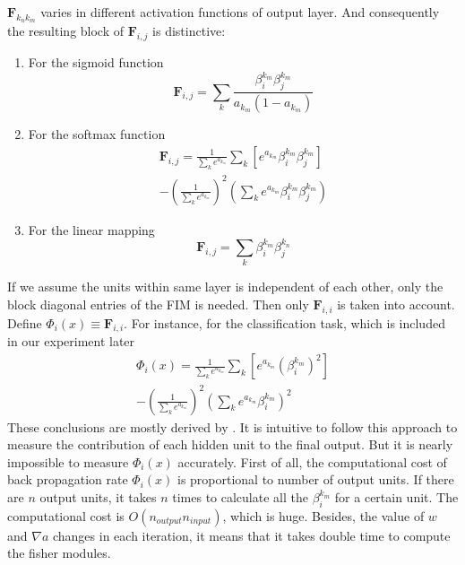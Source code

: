 \documentclass{sig-alternate}
\begin{document}
    $\pmb{F}_{k_nk_m}$ varies in different activation functions of output layer. And consequently the resulting block of $\pmb{F}_{i,j}$ is distinctive:
    \begin{enumerate}
        \item For the sigmoid function
        \begin{equation}
            \pmb{F}_{i,j} = \sum_{k}\frac{\beta_i^{k_m}\beta_j^{k_m}}{a_{k_m}(1-a_{k_m})}
        \end{equation}
        \item For the softmax function
        \begin{equation}
            \begin{aligned}
            \pmb{F}_{i,j} = \frac{1}{\sum_k e^{a_{k_m}}}\sum_k [e^{a_{k_m}}\beta_i^{k_m}\beta_j^{k_m}]
            \\
            -(\frac{1}{\sum_k e^{a_{k_m}}})^{2}(\sum_k e^{a_{k_m}}\beta_i^{k_m}\beta_j^{k_m})
            \end{aligned}
        \end{equation}
        \item For the linear mapping
        \begin{equation}
            \pmb{F}_{i,j} = \sum_k \beta_i^{k_m}\beta_j^{k_n}
        \end{equation}
    \end{enumerate}
    If we assume the units within same layer is independent of each other, only the block diagonal entries of the FIM is needed. Then only $\pmb{F}_{i,i}$ is taken into account. Define $\Phi_i(x) \equiv \pmb{F}_{i, i}$. For instance, for the classification task, which is included in our experiment later
    \begin{equation}
        \begin{aligned}
         \Phi_i(x)= \frac{1}{\sum_k e^{a_{k_m}}}\sum_k [e^{a_{k_m}}(\beta_i^{k_m})^{2}]\\
         -(\frac{1}{\sum_k e^{a_{k_m}}})^{2}(\sum_k e^{a_{k_m}}\beta_i^{k_m})^{2}
        \end{aligned}
    \end{equation}
    These conclusions are mostly derived by \cite{DBLP:journals/corr/abs-1303-0818}. It is intuitive to follow this approach to measure the contribution of each hidden unit to the final output. But it is nearly impossible to measure $\Phi_i(x)$ accurately. First of all, the computational cost of back propagation rate $\Phi_i(x)$ is proportional to number of output units. If there are $n$ output units, it takes $n$ times to calculate all the $\beta_i^{k_m}$ for a certain unit. The computational cost is $O(n_{output}n_{input})$, which is huge.  Besides, the value of $w$ and $\nabla a$ changes in each iteration, it means that it takes double time to compute the fisher modules. 
    
\end{document}

